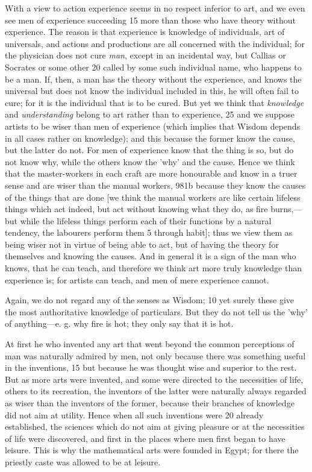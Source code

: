 With a view to action experience seems in no respect inferior to art, and we even see men of experience succeeding 15 more than those who have theory without experience. The reason is that experience is knowledge of individuals, art of universals, and actions and productions are all concerned with the individual; for the physician does not cure \emph{man}, except in an incidental way, but Callias or Socrates or some other 20 called by some such individual name, who happens to be a man. If, then, a man has the theory without the experience, and knows the universal but does not know the individual included in this, he will often fail to cure; for it is the individual that is to be cured. But yet we think that \emph{knowledge} and \emph{understanding} belong to art rather than to experience, 25 and we suppose artists to be wiser than men of experience (which implies that Wisdom depends in all cases rather on knowledge); and this because the former know the cause, but the latter do not. For men of experience know that the thing is so, but do not know why, while the others know the 'why' and the cause. Hence we think that the master-workers in each craft are more honourable and know in a truer sense and are wiser than the manual workers, 981b because they know the causes of the things that are done [we think the manual workers are like certain lifeless things which act indeed, but act without knowing what they do, as fire burns,—but while the lifeless things perform each of their functions by a natural tendency, the labourers perform them 5 through habit]; thus we view them as being wiser not in virtue of being able to act, but of having the theory for themselves and knowing the causes. And in general it is a sign of the man who knows, that he can teach, and therefore we think art more truly knowledge than experience is; for artists can teach, and men of mere experience cannot.

Again, we do not regard any of the senses as Wisdom; 10 yet surely these give the most authoritative knowledge of particulars. But they do not tell us the 'why' of anything—e. g. why fire is hot; they only say that it is hot.

At first he who invented any art that went beyond the common perceptions of man was naturally admired by men, not only because there was something useful in the inventions, 15 but because he was thought wise and superior to the rest. But as more arts were invented, and some were directed to the necessities of life, others to its recreation, the inventors of the latter were naturally always regarded as wiser than the inventors of the former, because their branches of knowledge did not aim at utility. Hence when all such inventions were 20 already established, the sciences which do not aim at giving pleasure or at the necessities of life were discovered, and first in the places where men first began to have leisure. This is why the mathematical arts were founded in Egypt; for there the priestly caste was allowed to be at leisure.

